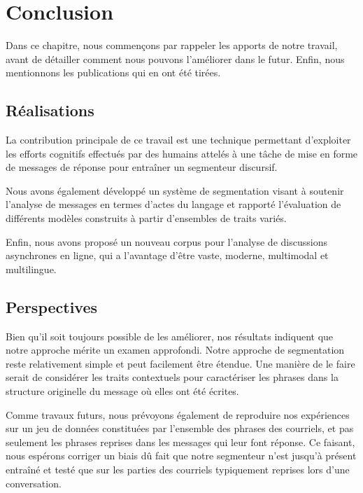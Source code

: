 
\chapter{Conclusion}

\label{ch:conclusions}

Dans ce chapitre, nous commençons par rappeler les apports de notre travail, avant de détailler comment nous pouvons l'améliorer dans le futur. Enfin, nous mentionnons les publications qui en ont été tirées.

\section{Réalisations}

La contribution principale de ce travail est une technique permettant d'exploiter les efforts cognitifs effectués par des humains attelés à une tâche de mise en forme de messages de réponse pour entraîner un segmenteur discursif.

Nous avons également développé un système de segmentation visant à soutenir l'analyse de messages en termes d'actes du langage et rapporté l'évaluation de différents modèles construits à partir d'ensembles de traits variés.

Enfin, nous avons proposé un nouveau corpus pour l'analyse de discussions asynchrones en ligne, qui a l'avantage d'être vaste, moderne, multimodal et multilingue.

\section{Perspectives}

Bien qu'il soit toujours possible de les améliorer, nos résultats indiquent que notre approche mérite un examen approfondi. Notre approche de segmentation reste relativement simple et peut facilement être étendue. Une manière de le faire serait de considérer les traits contextuels pour caractériser les phrases dans la structure originelle du message où elles ont été écrites.

Comme travaux futurs, nous prévoyons également de reproduire nos expériences sur un jeu de données constituées par l'ensemble des phrases des courriels, et pas seulement les phrases reprises dans les messages qui leur font réponse. Ce faisant, nous espérons corriger un biais dû fait que notre segmenteur n'est jusqu'à présent entraîné et testé que sur les parties des courriels typiquement reprises lors d'une conversation.

